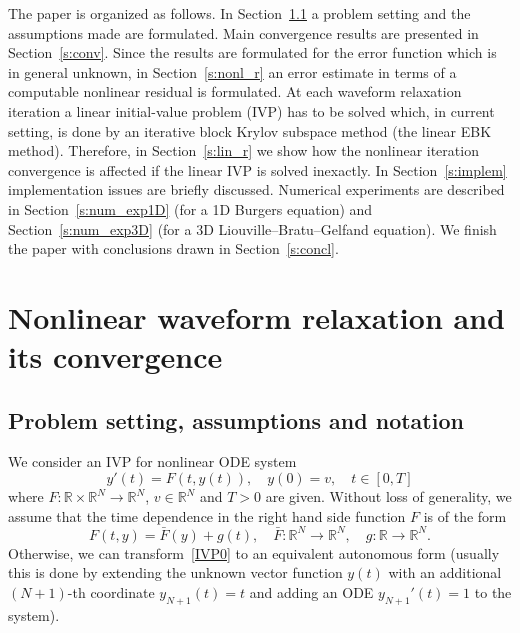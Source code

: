 \documentclass[sn-aps]{sn-jnl}
\theoremstyle{thmstyleone}%
\theoremstyle{thmstyletwo}%
\theoremstyle{thmstylethree}%
\newcommand{\Rr}{\mathbb{R}}
\begin{document}
The paper is organized as follows.
In Section~\ref{s:setting} a problem setting and the assumptions made are
formulated.
Main convergence results are presented in Section~\ref{s:conv}.
Since the results are formulated for the error function
which is in general unknown, in Section~\ref{s:nonl_r} an error estimate
in terms of a computable nonlinear residual is formulated.
At each waveform relaxation iteration a linear initial-value problem (IVP)
has to be solved which, in current setting, is done by an iterative block
Krylov subspace method (the linear EBK method).
Therefore, in Section~\ref{s:lin_r} we show how the nonlinear iteration
convergence is affected if the linear IVP is solved inexactly.
In Section~\ref{s:implem} implementation issues are briefly discussed.
Numerical experiments are described in Section~\ref{s:num_exp1D}
(for a 1D Burgers equation) and Section~\ref{s:num_exp3D}
(for a 3D Liouville–Bratu–Gelfand equation).
We finish the paper with conclusions drawn in Section~\ref{s:concl}.

\section{Nonlinear waveform relaxation and its convergence}
\subsection{Problem setting, assumptions and notation}
\label{s:setting}
We consider an IVP for nonlinear ODE system
\begin{equation}
\label{IVP0}
y'(t) = F(t,y(t)),  \quad y(0)=v,\quad t\in[0,T]
\end{equation}
where $F:\Rr\times\Rr^N\rightarrow\Rr^N$, $v\in\Rr^N$ and $T>0$ are given.
Without loss of generality, we assume that
the time dependence in the right hand side function $F$ is of the form
\begin{equation}
\label{autonom}
F(t,y) = \bar{F}(y) + g(t),
\quad \bar{F}:\Rr^N\rightarrow\Rr^N,
\quad g : \Rr\rightarrow\Rr^N.
\end{equation}
Otherwise, we can transform~\eqref{IVP0} to an equivalent autonomous form
(usually this is done by extending the unknown vector function $y(t)$ with an additional
$(N+1)$-th coordinate $y_{N+1}(t)=t$ and adding an ODE $y_{N+1}'(t)=1$ to the
system).
\end{document}
